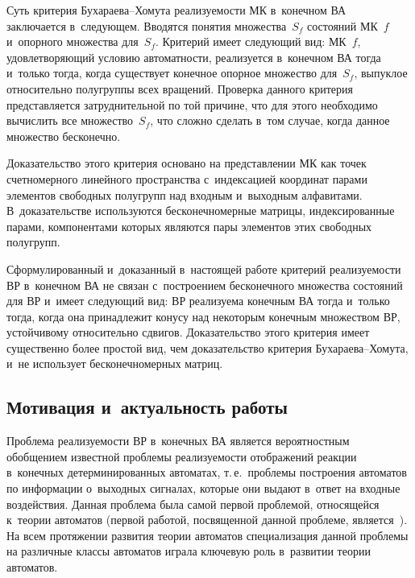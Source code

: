 \begin{multicols}{2}
Суть критерия Бу\-ха\-ра\-ева--Хо\-му\-та реали\-зу\-емости МК в~конечном 
ВА~\cite[теорема~2.2.1, с.~50]{8-mir} заключается
в~следующем. Вводятся понятия множества~$S_f$ состояний МК~$f$
 и~опорного множества для~$S_f$.
Критерий имеет следующий вид: МК~$f$,
удовлетворяющий условию автоматности, реализуется в~конечном ВА
тогда и~только тогда, когда существует конечное опорное множество
для~$S_f$, выпуклое относительно полугруппы всех вращений.
Проверка данного критерия представляется затруднительной
по той причине, что для этого необходимо вы\-чис\-лить все  множество~$S_f$,
что сложно сделать в~том случае, когда данное множество  бесконечно.

Доказательство этого критерия основано на представлении
МК как точек счетномерного линейного пространства с~индексацией координат
парами элементов свободных полугрупп
над входным и~выходным алфавитами. В~доказательстве используются
бесконечномерные матрицы, индексированные парами, компонентами которых являются
 пары элементов этих свободных полугрупп.

 Сформулированный и~доказанный в~настоящей работе
 критерий реализуемости ВР в~конечном ВА не связан
 с~построением бесконечного множества состояний для
ВР и~имеет следующий  вид: ВР реализуема конечным ВА тогда и~только тогда,
когда она принадлежит конусу над некоторым конечным множеством ВР, устойчивому
относительно сдвигов. Доказательство этого критерия
имеет существенно более простой вид, чем
доказательство критерия Бухараева--Хо\-му\-та,
 и~не использует бесконечномерных матриц.

\subsection{Мотивация и~актуальность работы}

Проблема реализуемости ВР в~конечных ВА является вероятностным
обобщением известной проблемы реализуемости отображений реакции
в~конечных детерминированных автоматах, т.\,е.\ проб\-ле\-мы построения
автоматов по информации о~выходных сигналах, которые они выдают
в~ответ на входные воздействия. Данная проблема была самой первой
проблемой, относящейся к~теории автоматов (первой работой,
посвященной данной проблеме, является~\cite{25-mir}). На всем
протяжении развития теории автоматов специализация данной проблемы
на различные классы автоматов играла ключевую роль в~развитии теории
автоматов.


\end{multicols}
